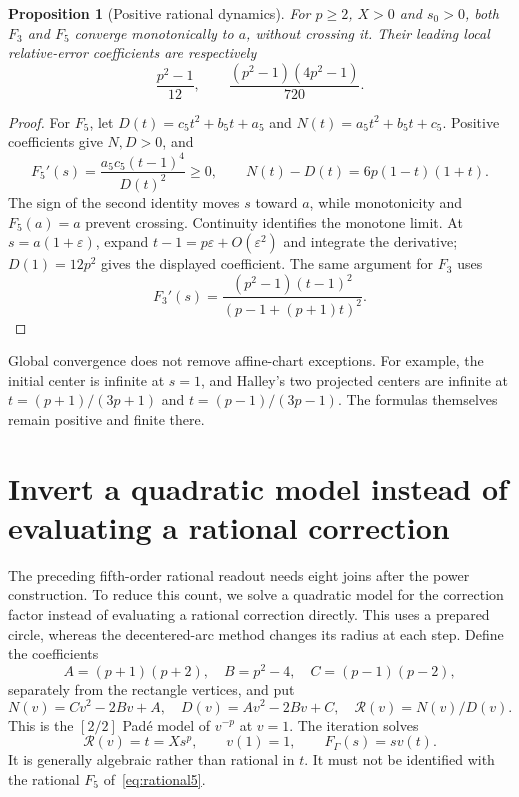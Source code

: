 \documentclass[11pt,a4paper]{article}
\newtheorem{proposition}[theorem]{Proposition}
\theoremstyle{remark}\newtheorem{remark}[theorem]{Remark}
\begin{document}
\begin{proposition}[Positive rational dynamics]\label{prop:rational}
For $p\ge2$, $X>0$ and $s_0>0$, both $F_3$ and $F_5$ converge monotonically to $a$, without crossing it. Their leading local relative-error coefficients are respectively
\[
 \frac{p^2-1}{12},\qquad \frac{(p^2-1)(4p^2-1)}{720}.
\]
\end{proposition}
\begin{proof}
For $F_5$, let $D(t)=c_5 t^2+b_5 t+a_5$ and $N(t)=a_5 t^2+b_5 t+c_5$. Positive coefficients give $N,D>0$, and
\[
 F_5'(s)=\frac{a_5c_5(t-1)^4}{D(t)^2}\ge0,\qquad N(t)-D(t)=6p(1-t)(1+t).
\]
The sign of the second identity moves $s$ toward $a$, while monotonicity and $F_5(a)=a$ prevent crossing. Continuity identifies the monotone limit. At $s=a(1+\varepsilon)$, expand $t-1=p\varepsilon+O(\varepsilon^2)$ and integrate the derivative; $D(1)=12p^2$ gives the displayed coefficient. The same argument for $F_3$ uses
\[
 F_3'(s)=\frac{(p^2-1)(t-1)^2}{(p-1+(p+1)t)^2}.
\]
\end{proof}

Global convergence does not remove affine-chart exceptions. For example, the initial center is infinite at $s=1$, and Halley's two projected centers are infinite at $t=(p+1)/(3p+1)$ and $t=(p-1)/(3p-1)$. The formulas themselves remain positive and finite there.

\section{Invert a quadratic model instead of evaluating a rational correction}\label{sec:inverse}
The preceding fifth-order rational readout needs eight joins after the power construction. To reduce this count, we solve a quadratic model for the correction factor instead of evaluating a rational correction directly. This uses a prepared circle, whereas the decentered-arc method changes its radius at each step. Define the coefficients
\begin{equation}\label{eq:ABC}
 A=(p+1)(p+2),\quad B=p^2-4,\quad C=(p-1)(p-2),
\end{equation}
separately from the rectangle vertices, and put
\begin{equation}\label{eq:model}
 N(v)=Cv^2-2Bv+A,\quad D(v)=Av^2-2Bv+C,\quad \mathcal R(v)=N(v)/D(v).
\end{equation}
This is the $[2/2]$ Pad\'e model of $v^{-p}$ at $v=1$. The iteration solves
\begin{equation}\label{eq:implicit}
 \mathcal R(v)=t=Xs^p,\qquad v(1)=1,\qquad F_\Gamma(s)=sv(t).
\end{equation}
It is generally algebraic rather than rational in $t$. It must not be identified with the rational $F_5$ of~\eqref{eq:rational5}.
\end{document}
